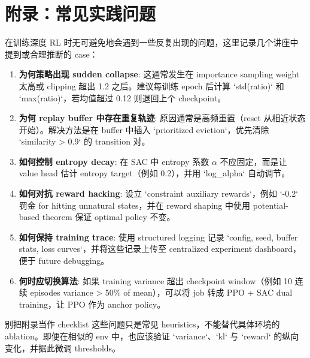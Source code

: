 \section{附录：常见实践问题}

在训练深度 RL 时无可避免地会遇到一些反复出现的问题，这里记录几个讲座中提到或合理推断的 case：

\begin{enumerate}
    \item \textbf{为何策略出现 sudden collapse}: 这通常发生在 importance sampling weight 太高或 clipping 超出 1.2 之后。建议每训练 epoch 后计算 `std(ratio)` 和 `max(ratio)`，若均值超过 0.12 则退回上个 checkpoint。
    \item \textbf{为何 replay buffer 中存在重复轨迹}: 原因通常是高频重置（reset 从相近状态开始）。解决方法是在 buffer 中插入 `prioritized eviction`，优先清除 `similarity > 0.9` 的 transition 对。
    \item \textbf{如何控制 entropy decay}: 在 SAC 中 entropy 系数 $\alpha$ 不应固定，而是让 value head 估计 entropy target（例如 0.2），并用 `log_alpha` 自动调节。
    \item \textbf{如何对抗 reward hacking}: 设立 `constraint auxiliary rewards`，例如 `-0.2` 罚金 for hitting unnatural states，并在 reward shaping 中使用 potential-based theorem 保证 optimal policy 不变。
    \item \textbf{如何保持 training trace}: 使用 structured logging 记录 `config, seed, buffer stats, loss curves`，并将这些记录上传至 centralized experiment dashboard，便于 future debugging。
    \item \textbf{何时应切换算法}: 如果 training variance 超出 checkpoint window（例如 10 连续 episodes variance > 50\% of mean），可以将 job 转成 PPO + SAC dual training，让 PPO 作为 anchor policy。
\end{enumerate}

\begin{warningbox}{别把附录当作 checklist}
这些问题只是常见 heuristics，不能替代具体环境的 ablation。即便在相似的 env 中，也应该验证 `variance`、`kl` 与 `reward` 的纵向变化，并据此微调 thresholds。
\end{warningbox}


